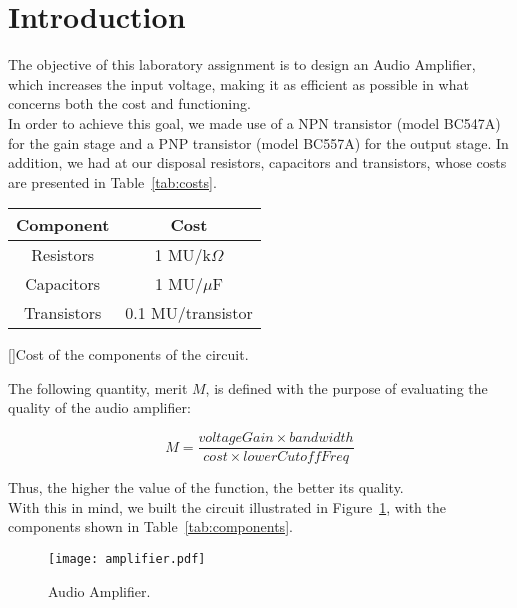\section{Introduction}
\label{sec:introduction}

The objective of this laboratory assignment is to design an Audio Amplifier, which increases the input voltage, making it as efficient as possible in what concerns both the cost and functioning. \\

In order to achieve this goal, we made use of a NPN transistor (model BC547A) for the gain stage and a PNP transistor (model BC557A) for the output stage. In addition, we had at our disposal resistors, capacitors and transistors, whose costs are presented in Table~\ref{tab:costs}.

\begin{center}
\begin{tabular}{ | c | c | }
\hline
\textbf{Component} & \textbf{Cost} \\
\hline
Resistors & 1 MU/k$\Omega$ \\  
Capacitors & 1 MU/$\mu$F \\
Transistors & 0.1 MU/transistor \\
\hline   
\end{tabular}
[]{Cost of the components of the circuit.}
\label{tab:costs}
\end{center}

The following quantity, merit $M$, is defined with the purpose of evaluating the quality of the audio amplifier:

\vspace{-2mm}

\begin{equation}
  M = \frac{voltageGain \times bandwidth}{cost \times lowerCutoffFreq}
\end{equation}

\vspace{2mm}

Thus, the higher the value of the function, the better its quality.\\

With this in mind, we built the circuit illustrated in Figure~\ref{fig:amplifier}, with the components shown in Table~\ref{tab:components}.

\begin{figure}[H] \centering
\texttt{[image: amplifier.pdf]}
\caption{Audio Amplifier.}
\label{fig:amplifier}
\end{figure}

